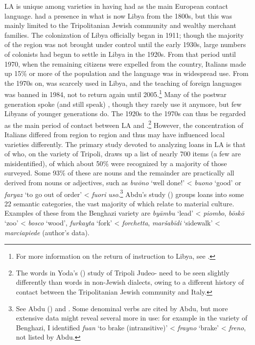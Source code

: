 \documentclass[output=paper]{langsci/langscibook}
\begin{document}
  LA is unique among  varieties in having had  as the main European contact language.  had a presence in what is now Libya from the 1800s, but this was mainly limited to the Tripolitanian Jewish community and wealthy merchant families. The  colonization of Libya officially began in 1911; though the majority of the region was not brought under  control until the early 1930s, large numbers of  colonists had begun to settle in Libya in the 1920s. From that period until 1970, when the remaining  citizens were expelled from the country, Italians made up 15\% or more of the population and the language was in widespread use. From the 1970s on,  was scarcely used in Libya, and the teaching of foreign languages was banned in 1984, not to return again until 2005.\footnote{For more information on the return of  instruction to Libya, see \citet{Danna2018phonetic}.} Many of the postwar generation spoke (and still speak) , though they rarely use it anymore, but few Libyans of younger generations do. The 1920s to the 1970s can thus be regarded as the main period of contact between LA and .\footnote{The  words in Yoda’s (\citeyear{Yoda2005}) study of Tripoli Judeo- need to be seen slightly differently than  words in non-Jewish dialects, owing to a different history of contact between the Tripolitanian Jewish community and Italy.} However, the concentration of Italians differed from region to region and thus may have influenced local varieties differently. The primary study devoted to analyzing  loans in LA is that of \citet{Abdu1988} who,  on the variety of Tripoli, draws up a list of nearly 700 items (a few are misidentified), of which about 50\% were recognized by a majority of those surveyed. Some 93\% of these are nouns and the remainder are practically all derived from nouns or adjectives, such as \textit{bwōno} ‘well done!’ < \textit{buono} ‘good’ or \textit{faryaz} ‘to go out of order’ <  \textit{fuori} \textit{uso}.\footnote{See Abdu (\citeyear[271]{Abdu1988}) and \citet{Danna2018phonetic}. Some denominal verbs are cited by Abdu, but more extensive data might reveal several more in use: for example in the variety of Benghazi, I identified \textit{fu{\R}an}  ‘to brake (intransitive)’ < \textit{frayno} ‘brake’ <  \textit{freno}, not listed by Abdu.} Abdu’s study (\citeyear[248–268]{Abdu1988}) groups  loans into some 22 semantic categories, the vast majority of which relate to material culture. Examples of these from the Benghazi variety are \textit{byāmbu} ‘lead’ < \textit{piombo}, \textit{bōskō} ‘zoo’ < \textit{bosco} `wood', \textit{furkayta} ‘fork’ < \textit{forchetta}, \textit{maršabīdi} ‘sidewalk’ < \textit{marciapiede} (author’s data).
\end{document}
